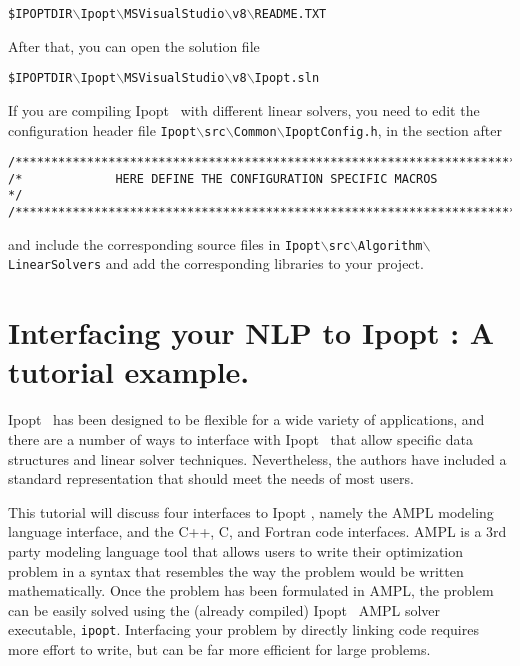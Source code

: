 \documentclass[10pt]{article}
\newcommand{\Ipopt}{{\sc Ipopt }}
\begin{document}
\texttt{\$IPOPTDIR$\backslash$Ipopt$\backslash$MSVisualStudio$\backslash$v8$\backslash$README.TXT}

After that, you can open the solution file

\texttt{\$IPOPTDIR$\backslash$Ipopt$\backslash$MSVisualStudio$\backslash$v8$\backslash$Ipopt.sln}

If you are compiling \Ipopt\ with different linear solvers, you need
to edit the configuration header file
\texttt{Ipopt$\backslash$src$\backslash$Common$\backslash$IpoptConfig.h},
in the section after
\begin{verbatim}
/***************************************************************************/
/*             HERE DEFINE THE CONFIGURATION SPECIFIC MACROS               */
/***************************************************************************/
\end{verbatim}
and include the corresponding source files in
\texttt{Ipopt$\backslash$src$\backslash$Algorithm$\backslash$LinearSolvers}
and add the corresponding libraries to your project.

\section{Interfacing your NLP to \Ipopt: A tutorial example.}
\label{sec:tutorial-example}

\Ipopt\ has been designed to be flexible for a wide variety of
applications, and there are a number of ways to interface with \Ipopt\
that allow specific data structures and linear solver
techniques. Nevertheless, the authors have included a standard
representation that should meet the needs of most users.

This tutorial will discuss four interfaces to \Ipopt, namely the AMPL
modeling language\cite{FouGayKer:AMPLbook} interface, and the C++, C,
and Fortran code interfaces.  AMPL is a 3rd party modeling language
tool that allows users to write their optimization problem in a syntax
that resembles the way the problem would be written mathematically.
Once the problem has been formulated in AMPL, the problem can be
easily solved using the (already compiled) \Ipopt\ AMPL solver
executable, {\tt ipopt}. Interfacing your problem by directly linking
code requires more effort to write, but can be far more efficient for
large problems.
\end{document}
